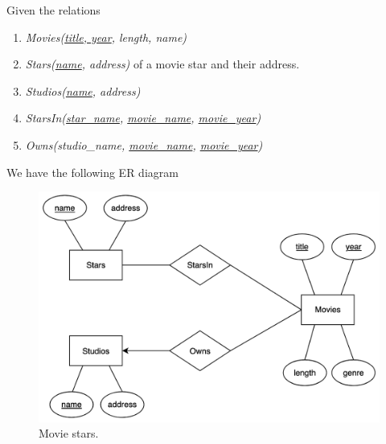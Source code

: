 \documentclass{article}
\begin{document}
      \begin{example}
        Given the relations 
        \begin{enumerate}
          \item \textit{Movies(\underline{title, year}, length, name)}
          \item \textit{Stars(\underline{name}, address)} of a movie star and their address. 
          \item \textit{Studios(\underline{name}, address)} 
          \item \textit{StarsIn(\underline{star\_name}, \underline{movie\_name}, \underline{movie\_year})} 
          \item \textit{Owns(studio\_name, \underline{movie\_name}, \underline{movie\_year})}
        \end{enumerate}
        We have the following ER diagram 
        \begin{figure}[H]
          \centering 
          \includegraphics[scale=0.3]{img/movie_stars.png}
          \caption{Movie stars. } 
          \label{fig:movie_stars}
        \end{figure}
      \end{example}
\end{document}

